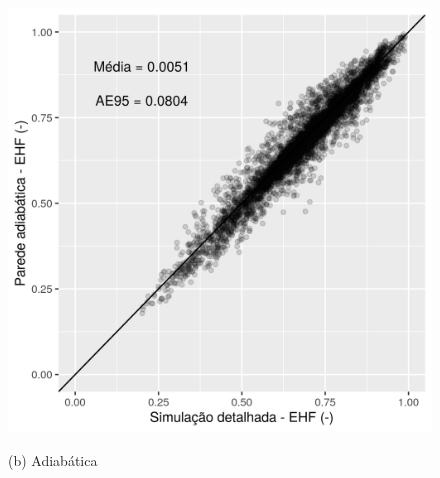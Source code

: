 \documentclass[brazil,hardcopy,openany]{ufscthesis} %
\begin{document}
\begin{figure}[h]
\begin{minipage}{.5\textwidth}
		\includegraphics[width=\linewidth]{img/szadi_EHF_scatter.png}
		\begin{center}
			\small{(b) Adiabática}\\
		\end{center}
	\end{minipage}
	\label{fig:szout}
\end{figure}


\end{document}
